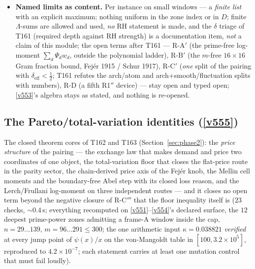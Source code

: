 \documentclass[11pt,a4paper]{article}
\begin{document}
\begin{itemize}[leftmargin=1.5em]
$1.0\times10^{-14}$ (KMS 1953); $\mathrm{odd\_toeplitz}(c^L)=L_P$ at zero tolerance.
\item \textbf{Named limits as content.} Per instance on small windows --- a \emph{finite
list} with an explicit maximum; nothing uniform in the zone index or in $D$; finite
$\Lambda$-sums are allowed and used, \emph{no} RH statement is made, and the $\delta$
triage of T161 (required depth against RH strength) is a documentation item, \emph{not} a
claim of this module; the open terms after T161 --- R-A$'$ (the prime-free log-moment
$\sum_d\Psi_d w_d$, outside the polynomial ladder), R-B$'$ (the $m$-free $16\times16$ Gram
fraction bound, Fej\'er 1915 / Schur 1917), R-C$'$ (\emph{one} split of the pairing with
$\delta_{\mathrm{eff}}<\tfrac12$; T161 refutes the arch/atom and arch+smooth/fluctuation
splits with numbers), R-D (a fifth R1$''$ device) --- stay open and typed open;
\vref{v553}'s algebra stays as stated, and nothing is re-opened.
\end{itemize}

\subsection{The Pareto/total-variation identities (\texorpdfstring{\vref{v555}}{v555})}\label{sec:v555}
The closed theorem cores of T162 and T163 (Section~\ref{sec:phase2}): the \emph{price
structure} of the pairing --- the exchange law that makes demand and price two coordinates
of one object, the total-variation floor that closes the flat-price route in the parity
sector, the chain-derived price axis of the Fej\'er knob, the Mellin cell moments and the
boundary-free Abel step with its closed loss reason, and the Lerch/Frullani log-moment on
three independent routes --- and it closes no open term beyond the negative closure of
R-C$'''$ that the floor inequality itself is
 ($23$ checks, ${\sim}0.4$\,s; everything recomputed
on \vref{v551}--\vref{v554}'s declared surface, the $12$ deepest prime-power zones
admitting a frame-A window inside the cap, $n=29\ldots139$, $m=96\ldots291\le300$; the one
arithmetic input $\kappa=0.038821$ \emph{verified} at every jump point of $\psi(x)/x$ on
the von-Mangoldt table in $[100,3.2\times10^{5}]$, reproduced to $4.2\times10^{-7}$; each
statement carries at least one mutation control that must fail loudly).
\end{document}
